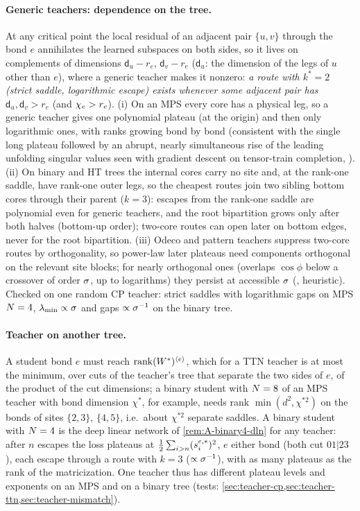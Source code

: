\paragraph{Generic teachers: dependence on the tree.} \derived{} \newresult{} At any critical point the local
residual of an adjacent pair $\{u,v\}$ through the bond $e$ annihilates the learned subspaces on both sides,
so it lives on complements of dimensions $\mathsf d_u-r_e$, $\mathsf d_v-r_e$ ($\mathsf d_u$: the dimension of the
legs of $u$ other than $e$), where a generic teacher makes it nonzero: \emph{a route with $k^*=2$ (strict
saddle, logarithmic escape) exists whenever some adjacent pair has $\mathsf d_u,\mathsf d_v>r_e$} (and
$\chi_{e}>r_e$). (i) On an MPS every core has a physical leg, so a generic teacher gives one polynomial plateau
(at the origin) and then only logarithmic ones, with ranks growing bond by bond (consistent with the
single long plateau followed by an abrupt, nearly simultaneous rise of the leading unfolding singular
values seen with gradient descent on tensor-train completion, \citealp[Fig.~3(b)]{milanesi2021implicit}).
(ii) On binary and HT trees
the internal cores carry no site and, at the rank-one saddle, have rank-one outer legs, so the cheapest
routes join two sibling bottom cores through their parent ($k=3$): escapes from the rank-one saddle are
polynomial even for generic teachers, and the root bipartition grows only after both halves (bottom-up
order); two-core routes can open later on bottom edges, never for the root bipartition. (iii) Odeco and
pattern teachers suppress two-core routes by orthogonality, so power-law later plateaus need components
orthogonal on the relevant site blocks; for nearly orthogonal ones (overlaps $\cos\phi$ below a crossover
of order $\sigma$, up to logarithms) they persist at accessible $\sigma$ (\conjecture, heuristic). Checked on one
random CP teacher: strict saddles with logarithmic gaps on MPS $N=4$, $\lambda_{\min}\propto\sigma$ and gaps
$\propto\sigma^{-1}$ on the binary tree.

\paragraph{Teacher on another tree.} \proven{} 
A student bond $e$ must reach $\operatorname{rank}(W^{*})^{\langle e\rangle}$, which for a TTN teacher is at most the minimum, over
cuts of the teacher's tree that separate the two sides of $e$, of the product of the cut dimensions; a
binary student with $N=8$ of an MPS teacher with bond dimension $\chi^*$, for example, needs rank
$\min(d^2,\chi^{*2})$ on the bonds of sites $\{2,3\}$, $\{4,5\}$, i.e.\ about $\chi^{*2}$ separate saddles. A binary student
with $N=4$ is the deep linear network of \cref{rem:A-binary4-dln} for any teacher: after $n$ escapes the loss
plateaus at $\frac12\sum_{i>n}(s^{e,*}_{i})^2$, $e$ either bond (both cut $01|23$), each escape through a route with
$k=3$ ($\propto\sigma^{-1}$), with as many plateaus as the rank of the matricization. One teacher thus has different plateau levels and exponents on an MPS and on
a binary tree \derived{} \newresult{} (tests:
\cref{sec:teacher-cp,sec:teacher-ttn,sec:teacher-mismatch}).

